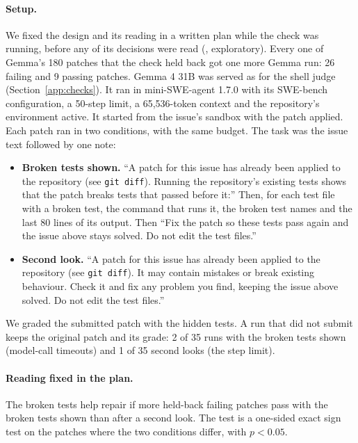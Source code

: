 \documentclass[10pt,letterpaper]{article}
\begin{document}
\paragraph{Setup.} We fixed the design and its reading in a written plan while the check was running, before any of
its decisions were read (, exploratory). Every one of Gemma's 180 patches that the check held
back got one more Gemma run: 26 failing and 9 passing patches. Gemma 4 31B was served as for the shell judge (Section~\ref{app:checks}).
It ran in mini-SWE-agent 1.7.0 with its SWE-bench configuration, a 50-step limit, a 65,536-token context and the
repository's environment active. It started from the
issue's sandbox with the patch applied. Each patch ran in two conditions, with the same budget. The task was the issue
text followed by one note:
\begin{itemize}
\item \textbf{Broken tests shown.} ``A patch for this issue has already been applied to the repository (see
\texttt{git diff}). Running the repository's existing tests shows that the patch breaks tests that passed before it:''
Then, for each test file with a broken test, the command that runs it, the broken test names and the last 80 lines
of its output. Then ``Fix the patch so these tests pass again and the issue above stays solved. Do not edit the test
files.''
\item \textbf{Second look.} ``A patch for this issue has already been applied to the repository (see \texttt{git
diff}). It may contain mistakes or break existing behaviour. Check it and fix any problem you find, keeping the issue
above solved. Do not edit the test files.''
\end{itemize}
We graded the submitted patch with the hidden tests. A run that did not submit keeps the original patch and its
grade: 2 of 35 runs with the broken tests shown (model-call timeouts) and 1 of 35 second looks (the step limit).

\paragraph{Reading fixed in the plan.} The broken tests help repair if more held-back failing patches pass with the
broken tests shown than after a second look. The test is a one-sided exact sign test on the patches where the two
conditions differ, with $p < 0.05$.
\end{document}
